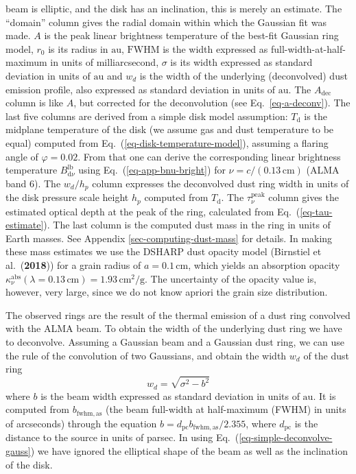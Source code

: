 \documentclass{aa}
\def\paperdsharpbirnstiel{Birnstiel et al.\ ({\bf 2018})}
\begin{document}
\begin{table*}
{  beam is elliptic, and the disk has an inclination, this is merely an estimate.
  The ``domain'' column gives the radial domain within which the Gaussian fit
  was made. $A$ is the peak linear brightness temperature of the best-fit
  Gaussian ring model, $r_0$ is its radius in $\mathrm{au}$, $\mathrm{FWHM}$ is
  the width expressed as full-width-at-half-maximum in units of milliarcsecond,
  $\sigma$ is its width expressed as standard deviation in units of
  $\mathrm{au}$ and $w_d$ is the width of the underlying (deconvolved) dust
  emission profile, also expressed as standard deviation in units of
  $\mathrm{au}$. The $A_{\mathrm{dec}}$ column is like $A$, but corrected for
  the deconvolution (see Eq.~\ref{eq-a-deconv}). The last five columns are
  derived from a simple disk model assumption: $T_{\mathrm{d}}$ is the midplane
  temperature of the disk (we assume gas and dust temperature to be equal)
  computed from Eq.~(\ref{eq-disk-temperature-model}), assuming a flaring angle
  of $\varphi=0.02$. From that one can derive the corresponding linear
  brightness temperature $B_{\mathrm{d}\nu}^{\mathrm{lb}}$ using
  Eq.~(\ref{eq-app-bnu-bright}) for $\nu=c/(0.13\,\mathrm{cm})$ (ALMA band 6).
  The $w_d/h_p$ column expresses the deconvolved dust ring width in units of the
  disk pressure scale height $h_p$ computed from $T_{\mathrm{d}}$. The
  $\tau_\nu^{\mathrm{peak}}$ column gives the estimated optical depth at the peak of the ring,
  calculated from Eq.~(\ref{eq-tau-estimate}). The last column is the computed dust mass in the
  ring in units of Earth masses. See Appendix \ref{sec-computing-dust-mass} for
  details. In making these mass estimates we use the DSHARP dust opacity model
  (\paperdsharpbirnstiel{}) for a grain radius of $a=0.1\,\mathrm{cm}$, which
  yields an absorption opacity
  $\kappa_\nu^{\mathrm{abs}}(\lambda=0.13\,\mathrm{cm})=1.93\,\mathrm{cm}^2/\mathrm{g}$.
  The uncertainty of the opacity value is, however, very large, since we do not
  know apriori the grain size distribution.}
\end{table*}

The observed rings are the result of the thermal emission of a dust ring convolved
with the ALMA beam. To obtain the width of the
underlying dust ring we have to deconvolve. Assuming a Gaussian beam and a
Gaussian dust ring, we can use the rule of the convolution of two Gaussians, and
obtain the width $w_d$ of the dust ring
\begin{equation}\label{eq-simple-deconvolve-gauss}
w_d=\sqrt{\sigma^2-b^2}
\end{equation}
where $b$ is the beam width expressed as standard deviation in units of
$\mathrm{au}$. It is computed from $b_{\mathrm{fwhm,as}}$ (the beam full-width
at half-maximum (FWHM) in units of arcseconds) through the equation
$b=d_{\mathrm{pc}}b_{\mathrm{fwhm,as}}/2.355$, where $d_{\mathrm{pc}}$ is the
distance to the source in units of parsec. In using
Eq.~(\ref{eq-simple-deconvolve-gauss}) we have ignored the elliptical shape of
the beam as well as the inclination of the disk.
\end{document}
